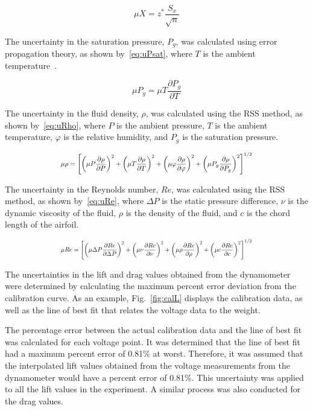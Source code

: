 \documentclass[journal,letterpaper]{IEEEtran}
\begin{document}
\begin{equation} \label{eq:conf}
    \mu X = z^* \frac{S_x}{\sqrt{n}}
\end{equation}

The uncertainty in the saturation pressure, $P_g$, was calculated using error propagation theory, as shown by~\eqref{eq:uPsat}, where $T$ is the ambient temperature~\cite{errorprop}.

\begin{equation} \label{eq:uPsat}
    \mu P_g = \mu T \frac{\partial P_g}{\partial T}
\end{equation}

The uncertainty in the fluid density, $\rho$, was calculated using the RSS method, as shown by~\eqref{eq:uRho}, where $P$ is the ambient pressure, $T$ is the ambient temperature, $\varphi$ is the relative humidity, and $P_g$ is the saturation pressure.

\begin{equation} \label{eq:uRho}
    \resizebox{227pt}{!}{$\displaystyle{\mu \rho = \left[\left(\mu P \frac{\partial \rho}{\partial P}\right)^2 + \left(\mu T \frac{\partial \rho}{\partial T}\right)^2 + \left(\mu \varphi \frac{\partial \rho}{\partial \varphi}\right)^2 + \left(\mu P_g \frac{\partial \rho}{\partial P_g}\right)^2\right]^{1/2}}$}
\end{equation}

The uncertainty in the Reynolds number, $Re$, was calculated using the RSS method, as shown by~\eqref{eq:uRe}, where $\Delta P$ is the static pressure difference, $\nu$ is the dynamic viscosity of the fluid, $\rho$ is the density of the fluid, and $c$ is the chord length of the airfoil.

\begin{equation} \label{eq:uRe}
    \resizebox{227pt}{!}{$\displaystyle{\mu Re = \left[\left(\mu \Delta P \frac{\partial Re}{\partial \Delta P}\right)^2 + \left(\mu \nu \frac{\partial Re}{\partial \nu}\right)^2 + \left(\mu \rho \frac{\partial Re}{\partial \rho}\right)^2 + \left(\mu c \frac{\partial Re}{\partial c}\right)^2\right]^{1/2}}$}
\end{equation}

The uncertainties in the lift and drag values obtained from the dynamometer were determined by calculating the maximum percent error deviation from the calibration curve.
As an example, Fig.~\ref{fig:calL} displays the calibration data, as well as the line of best fit that relates the voltage data to the weight. 

The percentage error between the actual calibration data and the line of best fit was calculated for each voltage point.
It was determined that the line of best fit had a maximum percent error of 0.81\% at worst.
Therefore, it was assumed that the interpolated lift values obtained from the voltage measurements from the dynamometer would have a percent error of 0.81\%.
This uncertainty was applied to all the lift values in the experiment.
A similar process was also conducted for the drag values.
\end{document}
